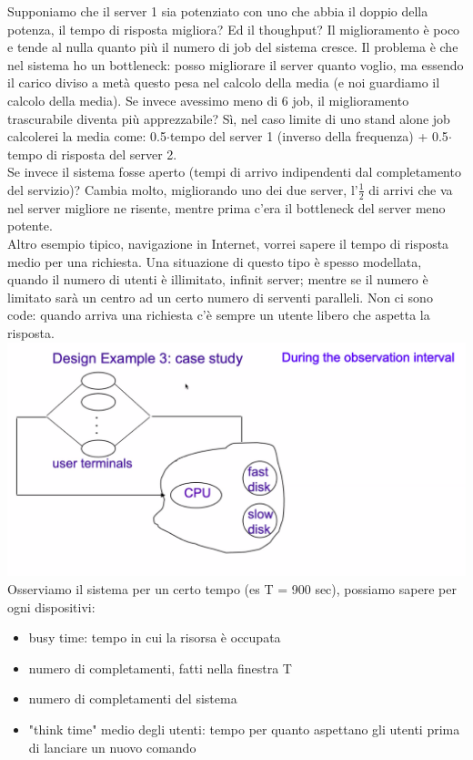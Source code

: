 \documentclass{article}
\begin{document}
Supponiamo che il server 1 sia potenziato con uno che abbia il doppio della potenza, il tempo di risposta migliora? Ed il thoughput? Il miglioramento è poco e tende al nulla quanto più il numero di job del sistema cresce. Il problema è che nel sistema ho un bottleneck: posso migliorare il server quanto voglio, ma essendo il carico diviso a metà questo pesa nel calcolo della media (e noi guardiamo il calcolo della media). Se invece avessimo meno di 6 job, il miglioramento trascurabile diventa più apprezzabile? Sì, nel caso limite di uno stand alone job calcolerei la media come: 0.5$\cdot$tempo del server 1 (inverso della frequenza) + 0.5$\cdot$tempo di risposta del server 2.\\ Se invece il sistema fosse aperto (tempi di arrivo indipendenti dal completamento del servizio)? Cambia molto, migliorando uno dei due server, l'$\frac{1}{2}$ di arrivi che va nel server migliore ne risente, mentre prima c'era il bottleneck del server meno potente.\\ Altro esempio tipico, navigazione in Internet, vorrei sapere il tempo di risposta medio per una richiesta. Una situazione di questo tipo è spesso modellata, quando il numero di utenti è illimitato, infinit server; mentre se il numero è limitato sarà un centro ad un certo numero di serventi paralleli. Non ci sono code: quando arriva una richiesta c'è sempre un utente libero che aspetta la risposta.\\
\includegraphics[scale=0.2]{images/PMCSN-3.png}\\
Osserviamo il sistema per un certo tempo (es T = 900 sec), possiamo sapere per ogni dispositivi:
\begin{itemize}
\item busy time: tempo in cui la risorsa è occupata
\item numero di completamenti, fatti nella finestra T
\item numero di completamenti del sistema
\item "think time" medio degli utenti: tempo per quanto aspettano gli utenti prima di lanciare un nuovo comando
\end{itemize}
\end{document}
